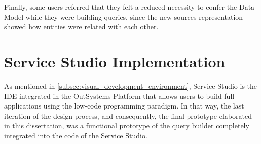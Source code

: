 Finally, some users referred that they felt a reduced necessity to confer the Data Model while they were building queries, since the new sources representation showed how entities were related with each other.












\section{Service Studio Implementation}
\label{sec:service_studio_implementation}

As mentioned in \ref{subsec:visual_development_environment}, Service Studio is the \gls{IDE} integrated in the OutSystems Platform that allows users to build full applications using the low-code programming paradigm. In that way, the last iteration of the design process, and consequently, the final prototype elaborated in this dissertation, was a functional prototype of the query builder completely integrated into the code of the Service Studio.

